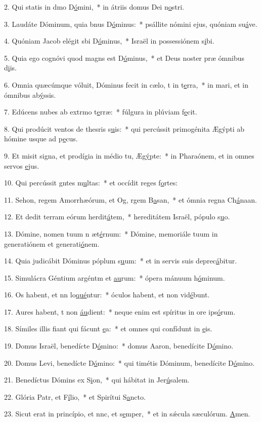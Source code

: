 2. Qui statis in dmo D\uline{ó}mini,~* in átriis domus Dei n\uline{o}stri.\par 
3. Laudáte Dóminum, quia bnus D\uline{ó}minus:~* psállite nómini ejus, quóniam su\uline{á}ve.\par 
4. Quóniam Jacob elégit sbi D\uline{ó}minus,~* Israël in possessiónem s\uline{i}bi.\par 
5. Quia ego cognóvi quod magns est D\uline{ó}minus,~* et Deus noster præ ómnibus d\uline{i}is.\par 
6. Omnia quæcúmque vóluit, Dóminus fecit in cælo, t in t\uline{e}rra,~* in mari, et in ómnibus ab\uline{ý}ssis.\par 
7. Edúcens nubes ab extrmo t\uline{e}rræ:~* fúlgura in plúviam f\uline{e}cit.\par 
8. Qui prodúcit ventos de thesris s\uline{u}is:~* qui percússit primogénita Ægýpti ab hómine usque ad p\uline{e}cus.\par 
9. Et misit signa, et prodígia in médio tu, Æg\uline{ý}pte:~* in Pharaónem, et in omnes servos \uline{e}jus.\par 
10. Qui percússit gntes m\uline{u}ltas:~* et occídit reges f\uline{o}rtes:\par 
11. Sehon, regem Amorrhæórum, et Og, rgem B\uline{a}san,~* et ómnia regna Ch\uline{á}naan.\par 
12. Et dedit terram eórum herdit\uline{á}tem,~* hereditátem Israël, pópulo s\uline{u}o.\par 
13. Dómine, nomen tuum n æt\uline{é}rnum:~* Dómine, memoriále tuum in generatiónem et generati\uline{ó}nem.\par 
14. Quia judicábit Dóminus póplum s\uline{u}um:~* et in servis suis deprec\uline{á}bitur.\par 
15. Simulácra Géntium argéntm et \uline{au}rum:~* ópera mánuum h\uline{ó}minum.\par 
16. Os habent, et nn lo\uline{qué}ntur:~* óculos habent, et non vid\uline{é}bunt.\par 
17. Aures habent, t non \uline{áu}dient:~* neque enim est spíritus in ore ips\uline{ó}rum.\par 
18. Símiles illis fiant qui fácunt \uline{e}a:~* et omnes qui confídunt in \uline{e}is.\par 
19. Domus Israël, benedícte D\uline{ó}mino:~* domus Aaron, benedícite D\uline{ó}mino.\par 
20. Domus Levi, benedícte D\uline{ó}mino:~* qui timétis Dóminum, benedícite D\uline{ó}mino.\par 
21. Benedíctus Dómins ex S\uline{i}on,~* qui hábitat in Jer\uline{ú}salem.\par 
22. Glória Patr, et F\uline{í}lio,~* et Spirítui S\uline{a}ncto.\par 
23. Sicut erat in princípio, et nnc, et s\uline{e}mper,~* et in sǽcula sæculórum. \uline{A}men.\par 
